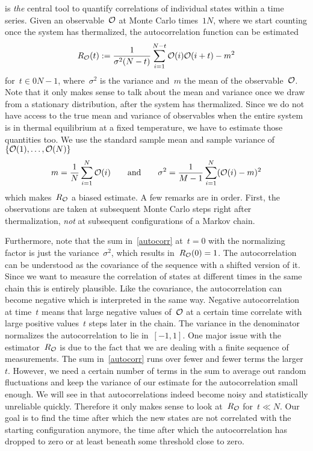  is \emph{the} central tool to quantify correlations of
individual states within a time series. Given an observable~$\mathcal{O}$ at Monte Carlo
times~$\numlist{1}{N}$, where we start counting once the system has thermalized,
the autocorrelation function can be estimated
%
\begin{equation}\label{autocorr}
  R_{\mathcal{O}}(t) := \frac{1}{\sigma^2 (N-t)} \sum_{i = 1}^{N-t}
    \mathcal{O}(i) \mathcal{O}(i+t) - m^2
\end{equation}
%
for~$t \in \numlist{0}{N-1}$, where~$\sigma^2$ is the variance and~$m$ the mean
of the observable~$\mathcal{O}$. Note that it only makes sense to talk about the mean
and variance once we draw from a stationary distribution, \ie{} after the system
has thermalized. Since we do not have access to the true mean and variance of
observables when the entire system is in thermal equilibrium at a fixed
temperature, we have to estimate those quantities too. We use the standard
sample mean and sample variance of~$\{\mathcal{O}(1),\dots,\mathcal{O}(N)\}$
%
\begin{equation}\label{samplemeanvar}
  m = \frac{1}{N} \sum_{i=1}^N \mathcal{O}(i) \qquad\text{and}\qquad
  \sigma^2 = \frac{1}{M-1} \sum_{i=1}^N (\mathcal{O}(i) - m)^2
\end{equation}
%
which makes~$R_{\mathcal{O}}$ a biased estimate. A few remarks are in order. First, the
observations are taken at subsequent Monte Carlo steps right after
thermalization, \emph{not} at subsequent configurations of a Markov chain.

Furthermore, note that the sum in~\eqref{autocorr} at~$t=0$ with the normalizing
factor is just the variance~$\sigma^2$, which results in~$R_{\mathcal{O}}(0) = 1$. The
autocorrelation can be understood as the covariance of the sequence with a
shifted version of it.  Since we want to measure the correlation of states at
different times in the same chain this is entirely plausible. Like the
covariance, the autocorrelation can become negative which is interpreted in the
same way.  Negative autocorrelation at time~$t$ means that large negative values
of~$\mathcal{O}$ at a certain time correlate with large positive values~$t$ steps later
in the chain.  The variance in the denominator normalizes the autocorrelation to
lie in~$[-1,1]$. One major issue with the estimator~$R_{\mathcal{O}}$ is due to the fact
that we are dealing with a finite sequence of measurements. The sum
in~\eqref{autocorr} runs over fewer and fewer terms the larger~$t$. However, we
need a certain number of terms in the sum to average out random fluctuations and
keep the variance of our estimate for the autocorrelation small enough. We will
see in  that autocorrelations indeed become noisy and
statistically unreliable quickly. Therefore it only makes sense to look
at~$R_{\mathcal{O}}$ for~$t \ll N$. Our goal is to find the time after which the new
states are not correlated with the starting configuration anymore, \ie{} the
time after which the autocorrelation has dropped to zero or at least beneath
some threshold close to zero.

